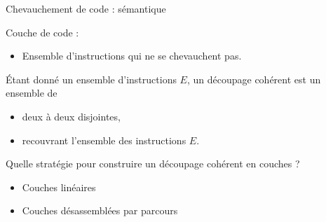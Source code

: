 \documentclass{beamer}
\begin{document}
\begin{frame}[fragile]{Chevauchement de code : sémantique}

Couche de code :
\begin{itemize}
 \item Ensemble d'instructions qui ne se chevauchent pas.
\end{itemize}

\begin{defi}
 Étant donné un ensemble d'instructions $E$, un découpage cohérent est un ensemble de \layers\
 \begin{itemize}
  \item deux à deux disjointes,
  \item recouvrant l'ensemble des instructions $E$.
 \end{itemize}
\label{def:decoupage}
\end{defi}

\pause
Quelle stratégie pour construire un découpage cohérent en couches ?
\begin{itemize}
 \item Couches linéaires
 \item Couches désassemblées par parcours
\end{itemize}

\end{frame}
\end{document}
